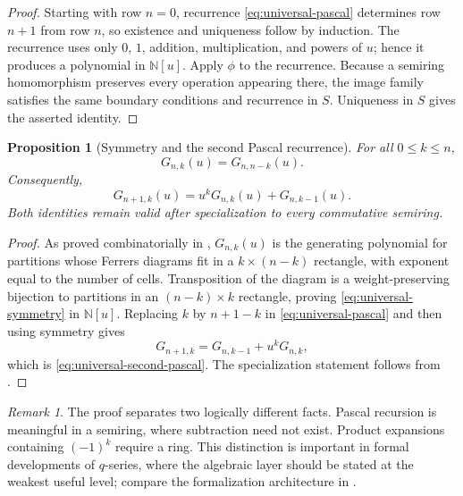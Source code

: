\documentclass[11pt,oneside,openany]{book}
\newtheorem{proposition}[theorem]{Proposition}
\theoremstyle{definition}
\theoremstyle{remark}
\newtheorem{remark}[theorem]{Remark}
\newcommand{\N}{\mathbb N}
\begin{document}
\begin{proof}
Starting with row $n=0$, recurrence \eqref{eq:universal-pascal} determines row $n+1$ from row $n$, so existence and uniqueness follow by induction.  The recurrence uses only $0$, $1$, addition, multiplication, and powers of $u$; hence it produces a polynomial in $\N[u]$.  Apply $\phi$ to the recurrence.  Because a semiring homomorphism preserves every operation appearing there, the image family satisfies the same boundary conditions and recurrence in $S$.  Uniqueness in $S$ gives the asserted identity.
\end{proof}

\begin{proposition}[Symmetry and the second Pascal recurrence]\label{prop:universal-symmetry}
For all $0\le k\le n$,
\begin{equation}
 G_{n,k}(u)=G_{n,n-k}(u).\label{eq:universal-symmetry}
\end{equation}
Consequently,
\begin{equation}
 G_{n+1,k}(u)=u^kG_{n,k}(u)+G_{n,k-1}(u).\label{eq:universal-second-pascal}
\end{equation}
Both identities remain valid after specialization to every commutative semiring.
\end{proposition}

\begin{proof}
As proved combinatorially in , $G_{n,k}(u)$ is the generating polynomial for partitions whose Ferrers diagrams fit in a $k\times(n-k)$ rectangle, with exponent equal to the number of cells.  Transposition of the diagram is a weight-preserving bijection to partitions in an $(n-k)\times k$ rectangle, proving \eqref{eq:universal-symmetry} in $\N[u]$.  Replacing $k$ by $n+1-k$ in \eqref{eq:universal-pascal} and then using symmetry gives
\[
 G_{n+1,k}=G_{n,k-1}+u^kG_{n,k},
\]
which is \eqref{eq:universal-second-pascal}.  The specialization statement follows from .
\end{proof}

\begin{remark}
The proof separates two logically different facts.  Pascal recursion is meaningful in a semiring, where subtraction need not exist.  Product expansions containing $(-1)^k$ require a ring.  This distinction is important in formal developments of $q$-series, where the algebraic layer should be stated at the weakest useful level; compare the formalization architecture in \cite{LauLeeOno2026}.
\end{remark}
\end{document}
